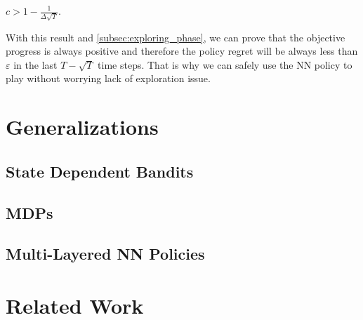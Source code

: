 \begin{lem}
    $c > 1 - \frac{1}{\Delta \sqrt{T}}$.
\end{lem}

With this result and \cref{subsec:exploring_phase}, we can prove that the objective progress is always positive and therefore the policy regret will be always less than $\varepsilon$ in the last $T - \sqrt{T}$ time steps. That is why we can safely use the NN policy to play without worrying lack of exploration issue.

\section{Generalizations}

\subsection{State Dependent Bandits}

\subsection{MDPs}

\subsection{Multi-Layered NN Policies}

\section{Related Work}




\nocite{langley00}
\fi

